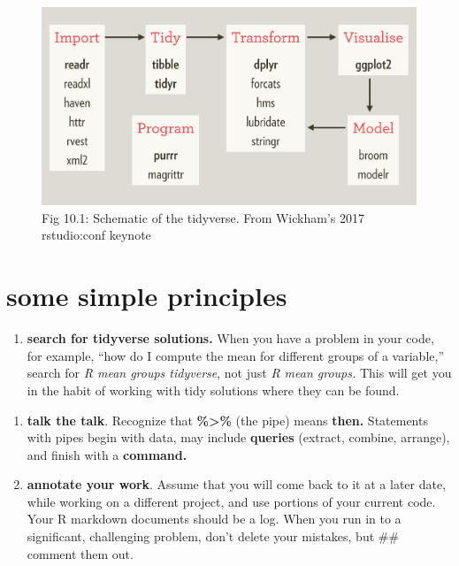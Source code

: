 \documentclass[
  openany]{book}
\newenvironment{Shaded}{\begin{snugshade}}{\end{snugshade}}
\newcommand{\DataTypeTok}[1]{\textcolor[rgb]{0.13,0.29,0.53}{#1}}
\newcommand{\KeywordTok}[1]{\textcolor[rgb]{0.13,0.29,0.53}{\textbf{#1}}}
\newcommand{\NormalTok}[1]{#1}
\newcommand{\OperatorTok}[1]{\textcolor[rgb]{0.81,0.36,0.00}{\textbf{#1}}}
\newcommand{\StringTok}[1]{\textcolor[rgb]{0.31,0.60,0.02}{#1}}
\providecommand{\tightlist}{%
  \setlength{\itemsep}{0pt}\setlength{\parskip}{0pt}}
\begin{document}
\begin{figure}
\centering
\includegraphics{tidyworld.PNG}
\caption{Fig 10.1: Schematic of the tidyverse. From Wickham's 2017 rstudio:conf keynote}
\end{figure}

\hypertarget{some-simple-principles}{%
\section{some simple principles}\label{some-simple-principles}}

\begin{enumerate}
\def\labelenumi{\arabic{enumi})}
\tightlist
\item
  \textbf{search for tidyverse solutions.} When you have a problem in your code, for example, ``how do I compute the mean for different groups of a variable,'' search for \emph{R mean groups tidyverse}, not just \emph{R mean groups.} This will get you in the habit of working with tidy solutions where they can be found.
\end{enumerate}

\begin{Shaded}
\end{Shaded}

\begin{enumerate}
\def\labelenumi{\arabic{enumi})}
\setcounter{enumi}{1}
\item
  \textbf{talk the talk}. Recognize that \textbf{\%\textgreater\%} (the pipe) means \textbf{then.} Statements with pipes begin with data, may include \textbf{queries} (extract, combine, arrange), and finish with a \textbf{command.}
\item
  \textbf{annotate your work}. Assume that you will come back to it at a later date, while working on a different project, and use portions of your current code. Your R markdown documents should be a log. When you run in to a significant, challenging problem, don't delete your mistakes, but \#\# comment them out.
\end{enumerate}
\end{document}
